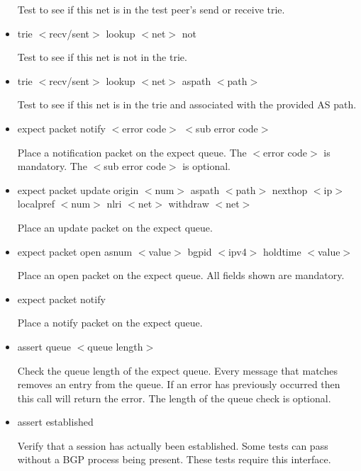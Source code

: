\documentclass[11pt]{article}
\begin{document}
\begin{itemize}
  Test to see if this net is in the test peer's send or receive trie.

\item {\sf trie $<$recv/sent$>$ lookup $<$net$>$ not}

  Test to see if this net is not in the trie.

\item {\sf trie $<$recv/sent$>$ lookup $<$net$>$ aspath $<$path$>$}

  Test to see if this net is in the trie and associated with the
  provided AS path.

\item {\sf expect packet notify $<$error code$>$ $<$sub error code$>$}

  Place a notification packet on the expect queue. The $<$error code$>$ is
  mandatory. The $<$sub error code$>$ is optional.
  
\item {\sf expect packet update 
                    origin $<$num$>$ 
                    aspath $<$path$>$ 
                    nexthop $<$ip$>$ 
                    localpref $<$num$>$
                    nlri $<$net$>$
                    withdraw $<$net$>$}

  Place an update packet on the expect queue.

\item {\sf expect packet open 
                        asnum $<$value$>$ 
                        bgpid $<$ipv4$>$ 
                        holdtime $<$value$>$}

  Place an open packet on the expect queue. All fields shown are mandatory.

\item {\sf expect packet notify}

  Place a notify packet on the expect queue.

\item {\sf assert queue $<$queue length$>$}

  Check the queue length of the expect queue. Every message that
  matches removes an entry from the queue. If an error has previously
  occurred then this call will return the error. The length of the
  queue check is optional.

\item {\sf assert established}

  Verify that a session has actually been established. Some tests can pass
  without a BGP process being present. These tests require this interface.


\end{itemize}
\end{document}
